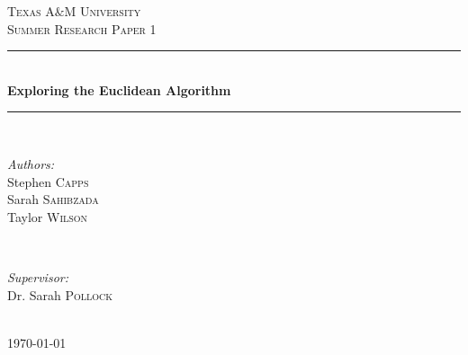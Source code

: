 \documentclass[11pt]{article}
\begin{document}
\begin{titlepage}

\newcommand{\HRule}{\rule{\linewidth}{0.5mm}} 

\center %
 

\textsc{\LARGE Texas A$\&$M University}\\[1.5cm] 
\textsc{\Large Summer Research Paper 1}\\[0.5cm] %


\HRule \\[0.4cm]
{ \huge \bfseries Exploring the Euclidean Algorithm}\\[0.4cm] 
\HRule \\[1.5cm]
 

\begin{minipage}{0.4\textwidth}
\begin{flushleft} \large
\emph{Authors:}\\
Stephen \textsc{Capps}\\
Sarah \textsc{Sahibzada}\\
Taylor \textsc{Wilson}
\end{flushleft}
\end{minipage}
~
\begin{minipage}{0.4\textwidth}
\begin{flushright} \large
\emph{Supervisor:} \\
Dr. Sarah \textsc{Pollock} 
\end{flushright}
\end{minipage}\\[4cm]


{\large \today}\\[3cm] 


\end{titlepage}
\end{document}
